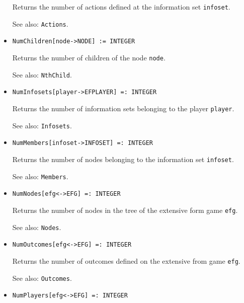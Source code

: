 \begin{itemize}
\bd
Returns the number of actions defined at the information
set \verb+infoset+.
\item
[See also:] {\tt Actions}.
\ed

\item
\protect \large \begin{verbatim}
NumChildren[node->NODE] := INTEGER
\end{verbatim}\normalsize

\bd
Returns the number of children of the node \verb+node+.
\item
[See also:] {\tt NthChild}.
\ed

\item
\protect \large \begin{verbatim}
NumInfosets[player->EFPLAYER] =: INTEGER
\end{verbatim}\normalsize

\bd
Returns the number of information sets belonging to the
player \verb+player+.
\item
[See also:] {\tt Infosets}.
\ed

\item
\protect \large \begin{verbatim}
NumMembers[infoset->INFOSET] =: INTEGER
\end{verbatim}\normalsize

\bd
Returns the number of nodes belonging to the information
set \verb+infoset+.
\item
[See also:] {\tt Members}.
\ed

\item
\protect \large \begin{verbatim}
NumNodes[efg<->EFG] =: INTEGER
\end{verbatim}\normalsize

\bd
Returns the number of nodes in the tree of the extensive form
game \verb+efg+.
\item
[See also:] {\tt Nodes}.
\ed

\item
\protect \large \begin{verbatim}
NumOutcomes[efg<->EFG] =: INTEGER
\end{verbatim} \normalsize

\bd
Returns the number of outcomes defined on the extensive from
game \verb+efg+.
\item
[See also:] {\tt Outcomes}.
\ed

\item
\protect \large \begin{verbatim}
NumPlayers[efg<->EFG] =: INTEGER
\end{verbatim} \normalsize


\end{itemize}

